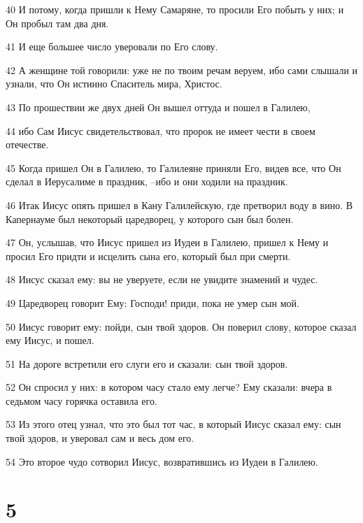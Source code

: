 \par 40 И потому, когда пришли к Нему Самаряне, то просили Его побыть у них; и Он пробыл там два дня.
\par 41 И еще большее число уверовали по Его слову.
\par 42 А женщине той говорили: уже не по твоим речам веруем, ибо сами слышали и узнали, что Он истинно Спаситель мира, Христос.
\par 43 По прошествии же двух дней Он вышел оттуда и пошел в Галилею,
\par 44 ибо Сам Иисус свидетельствовал, что пророк не имеет чести в своем отечестве.
\par 45 Когда пришел Он в Галилею, то Галилеяне приняли Его, видев все, что Он сделал в Иерусалиме в праздник, --ибо и они ходили на праздник.
\par 46 Итак Иисус опять пришел в Кану Галилейскую, где претворил воду в вино. В Капернауме был некоторый царедворец, у которого сын был болен.
\par 47 Он, услышав, что Иисус пришел из Иудеи в Галилею, пришел к Нему и просил Его придти и исцелить сына его, который был при смерти.
\par 48 Иисус сказал ему: вы не уверуете, если не увидите знамений и чудес.
\par 49 Царедворец говорит Ему: Господи! приди, пока не умер сын мой.
\par 50 Иисус говорит ему: пойди, сын твой здоров. Он поверил слову, которое сказал ему Иисус, и пошел.
\par 51 На дороге встретили его слуги его и сказали: сын твой здоров.
\par 52 Он спросил у них: в котором часу стало ему легче? Ему сказали: вчера в седьмом часу горячка оставила его.
\par 53 Из этого отец узнал, что это был тот час, в который Иисус сказал ему: сын твой здоров, и уверовал сам и весь дом его.
\par 54 Это второе чудо сотворил Иисус, возвратившись из Иудеи в Галилею.

\chapter{5}

